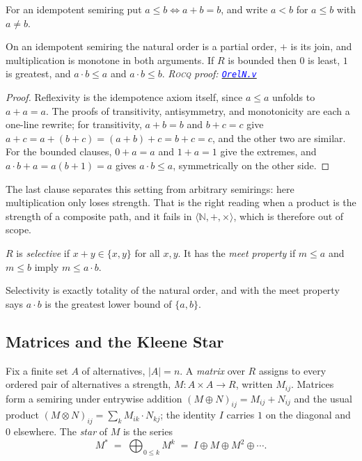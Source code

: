 \documentclass[a4paper,UKenglish,cleveref,autoref,thm-restate,anonymous]{lipics-v2021}
\newcommand{\Mstar}{M^{\ast}}
\newcommand{\rocq}{\textsc{Rocq}}
\newcommand{\anonrepo}{https://anonymous.4open.science/r/Semiring_graph_algorithm-000E}
\newcommand{\rocqfile}[2]{\href{\anonrepo/#1}{\textcolor{blue}{\texttt{#2}}}}
\newcommand{\proofat}[2]{{\footnotesize\itshape\rocq{} proof: \rocqfile{#1}{#2}}}
\begin{document}
\begin{definition}
For an idempotent semiring put $a \leq b \iff a+b=b$, and write $a<b$ for
$a\leq b$ with $a \neq b$.
\end{definition}

\begin{lemma}\label{lem:natural}
On an idempotent semiring the natural order is a partial order, $+$ is its
join, and multiplication is monotone in both arguments. If $R$ is bounded then
$0$ is least, $1$ is greatest, and $a\cdot b \leq a$ and $a\cdot b \leq b$.
\proofat{algorithm/OrelN.v}{OrelN.v}
\end{lemma}

\begin{proof}
Reflexivity is the idempotence axiom itself, since $a \leq a$ unfolds to
$a + a = a$. The proofs of transitivity, antisymmetry, and monotonicity are
each a one-line rewrite; for transitivity, $a+b=b$ and $b+c=c$ give
$a + c = a + (b + c) = (a+b) + c = b + c = c$, and the other two are
similar. For the bounded clauses, $0+a=a$ and $1+a=1$ give the extremes,
and $a\cdot b + a = a(b+1) = a$ gives $a\cdot b \leq a$, symmetrically on
the other side.
\end{proof}

The last clause separates this setting from arbitrary semirings: here
multiplication only loses strength. That is the right reading when a
product is the strength of a composite path, and it fails in
$\langle \mathbb{N}, +, \times\rangle$, which is therefore out of scope.

\begin{definition}\label{def:sel-meet}
$R$ is \emph{selective} if $x+y \in \{x,y\}$ for all $x,y$. It has the
\emph{meet property} if $m \leq a$ and $m \leq b$ imply $m \leq a\cdot b$.
\end{definition}

Selectivity is exactly totality of the natural order, and with
 the meet property says $a\cdot b$ is the greatest lower
bound of $\{a,b\}$.

\subsection{Matrices and the Kleene Star}

\begin{definition}
Fix a finite set $A$ of alternatives, $|A| = n$. A \emph{matrix} over $R$
assigns to every ordered pair of alternatives a strength, $M : A \times A
\to R$, written $M_{ij}$. Matrices form a semiring under entrywise
addition $(M\oplus N)_{ij} = M_{ij}+N_{ij}$ and the usual product
$(M\otimes N)_{ij} = \sum_k M_{ik}\cdot N_{kj}$; the identity $I$ carries
$1$ on the diagonal and $0$ elsewhere. The \emph{star} of $M$ is the
series
\[
  \Mstar
  \;=\; \bigoplus_{ 0 \leq k} M^{k}
  \;=\; I \oplus M \oplus M^{2} \oplus \cdots .
\]
\end{definition}
\end{document}
